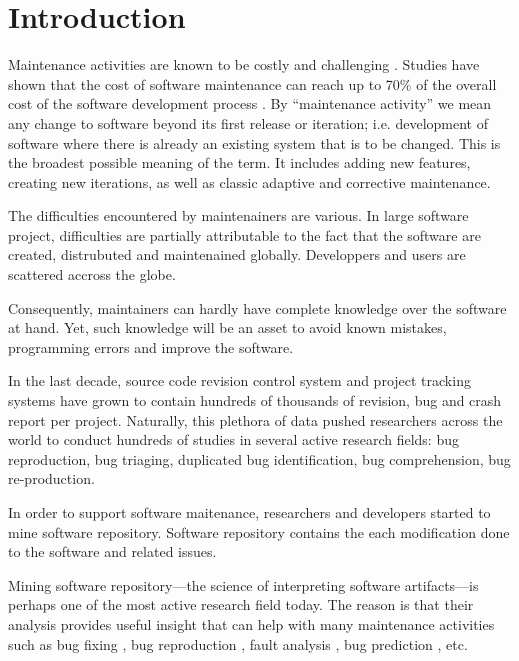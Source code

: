
\setcounter{page}{1}

\chapter{Introduction}

Maintenance activities are known to be costly and challenging \cite{Pressman2005}. Studies have shown that the cost of software maintenance can reach up to 70\% of the overall cost of the software development process \cite{HealthSocial2002}.
By ``maintenance activity'' we mean any change to software beyond its first release or iteration; i.e. development of software where there is already an existing system that is to be changed.
This is the broadest possible meaning of the term.
It includes adding new features, creating new iterations, as well as classic adaptive and corrective maintenance.

The difficulties encountered by maintenainers are various.
In large software project, difficulties are partially attributable to the fact that the software are created, distrubuted and maintenained globally.
Developpers and users are scattered accross the globe.

Consequently, maintainers can hardly have complete knowledge over the software at hand.
Yet, such knowledge will be an asset to avoid known mistakes, programming errors and improve the software.

In the last decade, source code revision control system and project tracking systems have grown to contain hundreds of thousands of revision, bug and crash report per project.
Naturally, this plethora of data pushed researchers across the world to conduct hundreds of studies in several active research fields: bug reproduction, bug triaging, duplicated bug identification, bug comprehension, bug re-production.

In order to support software maitenance, researchers and developers started to mine software repository.
Software repository contains the each modification done to the software and related issues.

Mining software repository---the science of interpreting software artifacts---is perhaps one of the most active research field today.
The reason is that their analysis provides useful insight that can help with many maintenance activities such as bug fixing \cite{Weiss2007,Saha2014}, bug reproduction \cite{Artzi2008,Jin2012,Chen2013}, fault analysis \cite{Jiang2012,Jin2013}, bug prediction \cite{Hovemeyer2007}, etc.

